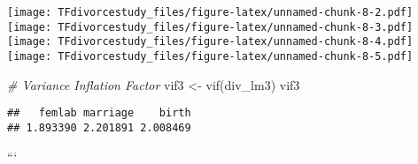 \documentclass[
]{article}
\newenvironment{Shaded}{\begin{snugshade}}{\end{snugshade}}
\newcommand{\CommentTok}[1]{\textcolor[rgb]{0.56,0.35,0.01}{\textit{#1}}}
\newcommand{\FunctionTok}[1]{\textcolor[rgb]{0.00,0.00,0.00}{#1}}
\newcommand{\NormalTok}[1]{#1}
\newcommand{\OtherTok}[1]{\textcolor[rgb]{0.56,0.35,0.01}{#1}}
\begin{document}
\texttt{[image: TFdivorcestudy\_files/figure-latex/unnamed-chunk-8-2.pdf]}
\texttt{[image: TFdivorcestudy\_files/figure-latex/unnamed-chunk-8-3.pdf]}
\texttt{[image: TFdivorcestudy\_files/figure-latex/unnamed-chunk-8-4.pdf]}
\texttt{[image: TFdivorcestudy\_files/figure-latex/unnamed-chunk-8-5.pdf]}

\begin{Shaded}
\begin{Highlighting}[]
\CommentTok{\# Variance Inflation Factor}
\NormalTok{vif3 }\OtherTok{\textless{}{-}} \FunctionTok{vif}\NormalTok{(div\_lm3)}
\NormalTok{vif3         }
\end{Highlighting}
\end{Shaded}

\begin{verbatim}
##   femlab marriage    birth 
## 1.893390 2.201891 2.008469
\end{verbatim}

```
\end{document}
